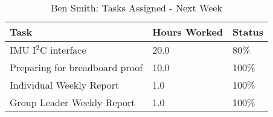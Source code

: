 \documentclass[12pt,compsoc]{IEEEtran}
\begin{document}
	\begin{table}[ht]
	\renewcommand{\arraystretch}{1.3}
		\caption{Ben Smith: Tasks Assigned - Next Week}
		
		\label{Summary of Ben Smith's activites: this week}
		
		\centering
		\begin{tabular}{p{5.5cm}|p{1cm}|p{1cm}}

		\hline
		\bfseries 	Task	            	 		& \bfseries Hours Worked	& \bfseries Status	\\
		\hline\hline
                    IMU I$^2$C interface            & 20.0                      & 80\%              \\
                    Preparing for breadboard proof  & 10.0                      & 100\%              \\
                    Individual Weekly Report		& 1.0 						& 100\% 			\\
                    Group Leader Weekly Report 		& 1.0						& 100\% 			\\
		\hline
		\end{tabular}
	\end{table}
\end{document}

